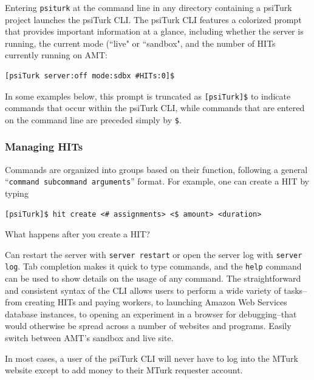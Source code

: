 \documentclass[twocolumn]{svjour3}          %
\begin{document}
Entering
\texttt{psiturk} at the command line in any directory containing a psiTurk project launches the
psiTurk CLI.
The psiTurk CLI features a colorized prompt that provides important information at a glance, including
whether the server is running, the current mode (``live" or ``sandbox", and the number of HITs currently running on AMT:

\begin{lstlisting}
[psiTurk server:off mode:sdbx #HITs:0]$
\end{lstlisting}

\noindent In some examples below, this prompt is truncated as \texttt{[psiTurk]\$} to indicate commands that occur within the psiTurk CLI, while commands that are entered on the command line are preceded simply by \texttt{\$}.


\subsubsection{Managing HITs}
Commands are organized into groups based on their function, following a general ``\texttt{command subcommand
arguments}'' format. For example, one can create a HIT by typing 

\begin{lstlisting}
[psiTurk]$ hit create <# assignments> <$ amount> <duration>
\end{lstlisting}

What happens after you create a HIT?

%

Can restart the server with \texttt{server restart} or open the server log with \texttt{server log}. 
Tab completion makes it quick to type commands, and the \texttt{help} command can be used to show
details on the usage of any command. 
The straightforward and consistent syntax of the CLI allows
users to perform a wide variety of tasks--from creating HITs and paying workers, to launching Amazon
Web Services database instances, to opening an experiment in a browser for debugging--that
would otherwise be spread across a number of websites and programs. 
Easily switch between AMT's sandbox and live site.

In most cases, a user of the
psiTurk CLI will never have to log into the MTurk website except to add money to their MTurk
requester account.
\end{document}
